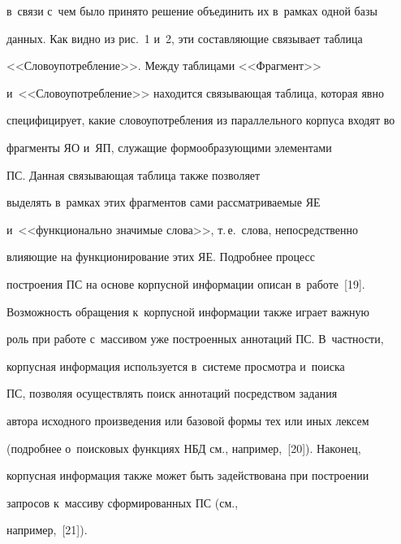 в~связи с~чем было принято решение объ\-еди\-нить их в~рамках одной базы 


данных. Как видно из рис.~1 и~2, эти составляющие связывает таб\-ли\-ца 


<<Сло\-во\-упо\-треб\-ле\-ние>>. Между таб\-ли\-ца\-ми <<Фрагмент>> 


и~<<Сло\-во\-упо\-треб\-ле\-ние>> находится свя\-зы\-ва\-ющая таб\-ли\-ца, которая явно 


специфицирует, какие сло\-во\-упо\-треб\-ле\-ния из параллельного корпуса входят во 


фраг\-мен\-ты ЯО и~ЯП, служащие формообразующими элементами 


ПС. Данная свя\-зы\-ва\-ющая таб\-ли\-ца так\-же позволяет 


выделять в~рамках этих фрагментов сами рас\-смат\-ри\-ва\-емые ЯЕ 


и~<<функционально значимые слова>>, т.\,е.\ слова, непосредственно 


влия\-ющие на функционирование этих ЯЕ. По\-дроб\-нее процесс 


по\-стро\-ения ПС на основе кор\-пус\-ной информации описан в~работе~[19].


   


   Возможность обращения к~корпусной информации так\-же играет важ\-ную 


роль при работе с~массивом уже по\-стро\-ен\-ных аннотаций ПС. В~част\-ности, 


корпусная информация используется в~сис\-те\-ме просмотра и~поиска 


ПС, поз\-во\-ляя осуществлять поиск аннотаций по\-сред\-ст\-вом задания 


автора исходного произведения или базовой формы тех или иных лексем 


(по\-дроб\-нее о~поисковых функциях НБД см., например,~[20]). Наконец, 


корпусная информация так\-же может быть задействована при по\-стро\-ении 


запросов к~массиву сформированных ПС (см., 


например,~[21]). 


   


